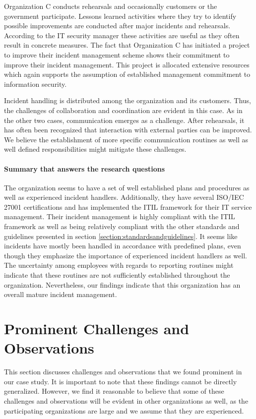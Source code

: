 Organization C conducts rehearsals and occasionally customers or the government participate. Lessons learned activities where they try to identify possible improvements are conducted after major incidents and rehearsals. According to the IT security manager these activities are useful as they often result in concrete measures. The fact that Organization C has initiated a project to improve their incident management scheme shows their commitment to improve their incident management. This project is allocated extensive resources which again supports the assumption of established management commitment to information security.

Incident handling is distributed among the organization and its customers. Thus, the challenges of collaboration and coordination are evident in this case. As in the other two cases, communication emerges as a challenge. After rehearsals, it has often been recognized that interaction with external parties can be improved. We believe the establishment of more specific communication routines as well as well defined responsibilities might mitigate these challenges.

\paragraph{Summary that answers the research questions}
The organization seems to have a set of well established plans and procedures as well as experienced incident handlers. Additionally, they have several ISO/IEC 27001 certifications and has implemented the ITIL framework for their IT service management. Their incident management is highly compliant with the ITIL framework as well as being relatively compliant with the other standards and guidelines presented in section \ref{section:standardsandguidelines}. It seems like incidents have mostly been handled in accordance with predefined plans, even though they emphasize the importance of experienced incident handlers as well. The uncertainty among employees with regards to reporting routines might indicate that these routines are not sufficiently established throughout the organization. Nevertheless, our findings indicate that this organization has an overall mature incident management. 

\section{Prominent Challenges and Observations}
\label{sec:discussionStructures}
This section discusses challenges and observations that we found prominent in our case study. It is important to note that these findings cannot be directly generalized. However, we find it reasonable to believe that some of these challenges and observations will be evident in other organizations as well, as the participating organizations are large and we assume that they are experienced.

